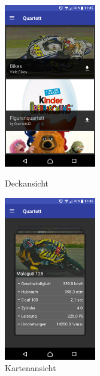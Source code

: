 \documentclass{scrartcl}
\begin{document}
\begin{figure}
  \centering
  \begin{minipage}{0.45\textwidth}
    \centering
    \includegraphics[width=4cm]{img/gallery_decks.png}
    \caption{Deckansicht}
  \end{minipage}
  \hfill
  \begin{minipage}{0.45\textwidth}
    \centering
    \includegraphics[width=4cm]{img/gallery_cards.png}
    \caption{Kartenansicht}
  \end{minipage}
\end{figure}
\end{document}

